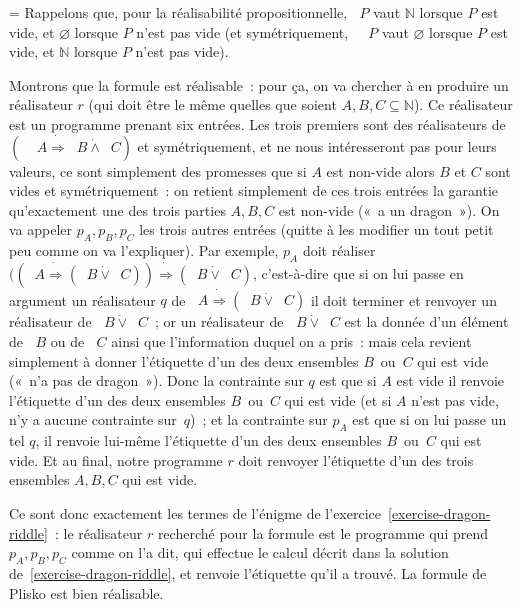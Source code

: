 \documentclass[12pt,a4paper]{article}
\theoremstyle{definition}
\newcommand{\dottedlimp}{\mathbin{\dot\Rightarrow}}
\newcommand{\dottedland}{\mathbin{\dot\land}}
\newcommand{\dottedlor}{\mathbin{\dot\lor}}
\newcommand{\dottedneg}{\mathop{\dot\neg}}
\newif\ifcorrige
\newenvironment{corrige}%
{\ifcorrige\relax\else\setbox0=\vbox\bgroup\fi%
\smallbreak\footnotesize\noindent{\underbar{\textit{Corrigé.}}\quad}}
{{\hbox{}\nobreak\hfill\checkmark}%
\ifcorrige\relax\else\egroup\fi\par}
\begin{document}
\begin{corrige}
Rappelons que, pour la réalisabilité propositionnelle, $\dottedneg P$
vaut $\mathbb{N}$ lorsque $P$ est vide, et $\varnothing$ lorsque $P$
n'est pas vide (et symétriquement, $\dottedneg\dottedneg P$ vaut
$\varnothing$ lorsque $P$ est vide, et $\mathbb{N}$ lorsque $P$ n'est
pas vide).

Montrons que la formule est réalisable : pour ça, on va chercher à en
produire un réalisateur $r$ (qui doit être le même quelles que soient
$A,B,C \subseteq \mathbb{N}$).  Ce réalisateur est un programme
prenant six entrées.  Les trois premiers sont des réalisateurs de
$(\dottedneg\dottedneg A \dottedlimp \dottedneg B\dottedland
\dottedneg C)$ et symétriquement, et ne nous intéresseront pas pour
leurs valeurs, ce sont simplement des promesses que si $A$ est
non-vide alors $B$ et $C$ sont vides et symétriquement : on retient
simplement de ces trois entrées la garantie qu'exactement une des
trois parties $A,B,C$ est non-vide (« a un dragon »).  On va appeler
$p_A,p_B,p_C$ les trois autres entrées (quitte à les modifier un tout
petit peu comme on va l'expliquer).  Par exemple, $p_A$ doit réaliser
$((\dottedneg A \dottedlimp (\dottedneg B\dottedlor \dottedneg C))
\dottedlimp (\dottedneg B\dottedlor \dottedneg C)$, c'est-à-dire que
si on lui passe en argument un réalisateur $q$ de $\dottedneg A
\dottedlimp (\dottedneg B\dottedlor \dottedneg C)$ il doit terminer et
renvoyer un réalisateur de $\dottedneg B\dottedlor \dottedneg C$ ; or
un réalisateur de $\dottedneg B\dottedlor \dottedneg C$ est la donnée
d'un élément de $\dottedneg B$ ou de $\dottedneg C$ ainsi que
l'information duquel on a pris : mais cela revient simplement à donner
l'étiquette d'un des deux ensembles $B$ ou $C$ qui est vide (« n'a pas
de dragon »).  Donc la contrainte sur $q$ est que si $A$ est vide il
renvoie l'étiquette d'un des deux ensembles $B$ ou $C$ qui est vide
(et si $A$ n'est pas vide, n'y a aucune contrainte sur $q$) ; et la
contrainte sur $p_A$ est que si on lui passe un tel $q$, il renvoie
lui-même l'étiquette d'un des deux ensembles $B$ ou $C$ qui est vide.
Et au final, notre programme $r$ doit renvoyer l'étiquette d'un des
trois ensembles $A,B,C$ qui est vide.

Ce sont donc exactement les termes de l'énigme de
l'exercice \ref{exercise-dragon-riddle} : le réalisateur $r$ recherché
pour la formule est le programme qui prend $p_A,p_B,p_C$ comme on l'a
dit, qui effectue le calcul décrit dans la solution
de \ref{exercise-dragon-riddle}, et renvoie l'étiquette qu'il a
trouvé.  La formule de Plisko est bien réalisable.


\end{corrige}
\end{document}
